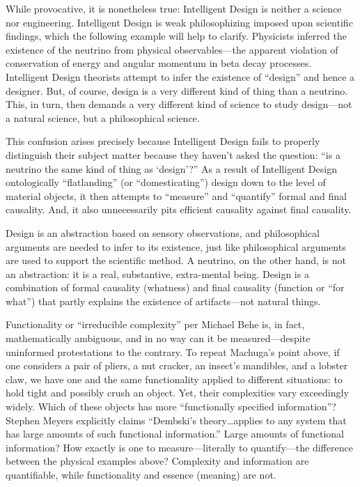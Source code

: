 While provocative, it is nonetheless true: Intelligent Design is neither a science nor engineering. Intelligent Design is weak philosophizing imposed upon scientific findings, which the following example will help to clarify. Physicists inferred the existence of the neutrino from physical observables---the apparent violation of conservation of energy and angular momentum in beta decay processes. Intelligent Design theorists attempt to infer the existence of ``design'' and hence a designer. But, of course, design is a very different kind of thing than a neutrino. This, in turn, then demands a very different kind of science to study design---not a natural science, but a philosophical science.

This confusion arises precisely because Intelligent Design fails to properly distinguish their subject matter because they haven’t asked the question: ``is a neutrino the same kind of thing as ‘design’?'' As a result of Intelligent Design ontologically ``flatlanding'' (or ``domesticating'') design down to the level of material objects, it then attempts to ``measure'' and ``quantify'' formal and final causality. And, it also unnecessarily pits efficient causality against final causality.

Design is an abstraction based on sensory observations, and philosophical arguments are needed to infer to its existence, just like philosophical arguments are used to support the scientific method. A neutrino, on the other hand, is not an abstraction: it is a real, substantive, extra-mental being. Design is a combination of formal causality (whatness) and final causality (function or ``for what'') that partly explains the existence of artifacts---not natural things.

Functionality or ``irreducible complexity'' per Michael Behe is, in fact, mathematically ambiguous, and in no way can it be measured---despite uninformed protestations to the contrary. To repeat Machuga’s point above, if one considers a pair of pliers, a nut cracker, an insect’s mandibles, and a lobster claw, we have one and the same functionality applied to different situations: to hold tight and possibly crush an object. Yet, their complexities vary exceedingly widely. Which of these objects has more ``functionally specified information''? Stephen Meyers explicitly claims ``Dembski’s theory\ldots applies to any system that has large amounts of such functional information.''\cite[pg.~372]{sigcell} Large amounts of functional information? How exactly is one to measure---literally to quantify---the difference between the physical examples above? Complexity and information are quantifiable, while functionality and essence (meaning) are not.

